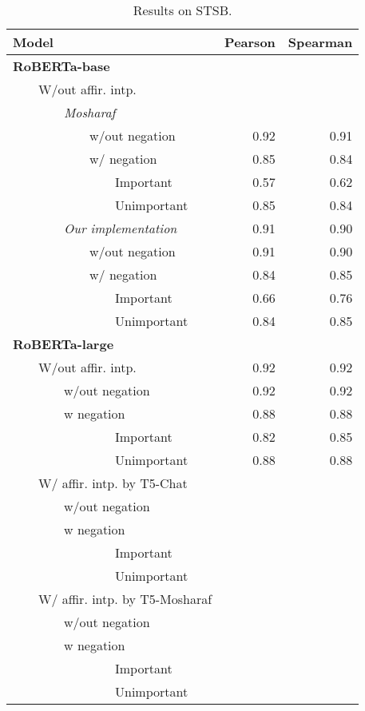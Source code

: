 \begin{table*}
\centering
\begin{tabular}{lrr}
\toprule
Model & Pearson & Spearman \\
\midrule
\textbf{RoBERTa-base} \\
~~~~W/out affir. intp. \\
~~~~~~~~\textit{Mosharaf} \\
~~~~~~~~~~~~w/out negation &0.92&0.91\\ 
~~~~~~~~~~~~w/ negation &0.85&0.84\\ 
~~~~~~~~~~~~~~~~Important &0.57&0.62\\ 
~~~~~~~~~~~~~~~~Unimportant &0.85&0.84\\ 
\midrule
~~~~~~~~\textit{Our implementation}  & 0.91 & 0.90  \\ 
~~~~~~~~~~~~w/out negation  & 0.91 & 0.90  \\ 
~~~~~~~~~~~~w/ negation  & 0.84 & 0.85  \\
~~~~~~~~~~~~~~~~Important  & 0.66 & 0.76  \\
~~~~~~~~~~~~~~~~Unimportant  & 0.84 & 0.85  \\  
\bottomrule
\textbf{RoBERTa-large} \\
~~~~W/out affir. intp.  & 0.92 & 0.92\\
~~~~~~~~w/out negation  & 0.92 & 0.92 \\ 
~~~~~~~~w negation  & 0.88 & 0.88\\ 
~~~~~~~~~~~~~~~~Important  & 0.82 & 0.85\\ 
~~~~~~~~~~~~~~~~Unimportant  & 0.88 & 0.88\\ 
\midrule
~~~~W/ affir. intp. by T5-Chat \\
~~~~~~~~w/out negation \\ 
~~~~~~~~w negation \\ 
~~~~~~~~~~~~~~~~Important \\ 
~~~~~~~~~~~~~~~~Unimportant \\ 
\midrule
~~~~W/ affir. intp. by T5-Mosharaf \\
~~~~~~~~w/out negation \\ 
~~~~~~~~w negation \\ 
~~~~~~~~~~~~~~~~Important \\ 
~~~~~~~~~~~~~~~~Unimportant \\ 
\bottomrule
\end{tabular}
\caption{Results on STSB.}
\end{table*}
